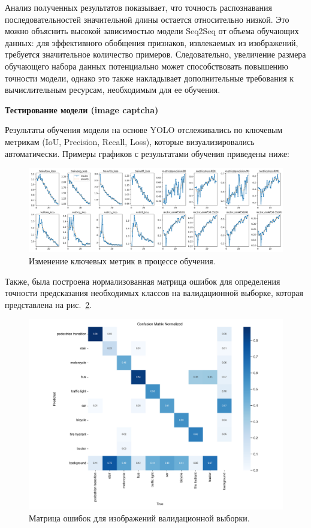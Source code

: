 Анализ полученных результатов показывает, что точность распознавания 
последовательностей значительной длины остается относительно низкой. Это можно 
объяснить высокой зависимостью модели Seq2Seq от объема обучающих данных: для 
эффективного обобщения признаков, извлекаемых из изображений, требуется 
значительное количество примеров. Следовательно, увеличение размера обучающего 
набора данных потенциально может способствовать повышению точности модели, 
однако это также накладывает дополнительные требования к вычислительным ресурсам, 
необходимым для ее обучения.

\textbf{Тестирование модели (image captcha)}

Результаты обучения модели на основе YOLO отслеживались по ключевым метрикам 
(IoU, Precision, Recall, Loss), которые визуализировались автоматически. Примеры 
графиков с результатами обучения приведены ниже:

\begin{figure}[H]
    \centering
    \includegraphics[width=1\linewidth]{imgs/imagecaptcha/results.png}
    \caption{Изменение ключевых метрик в процессе обучения.}
    \label{fig:metrics}
\end{figure}
\vspace{-0.5cm}

Также, была построена нормализованная матрица ошибок для определения точности 
предсказания необходимых классов на валидационной выборке, которая представлена 
на рис.~\ref{fig:confusion}.

\begin{figure}[H]
    \centering
    \includegraphics[width=1\linewidth]{
        imgs/imagecaptcha/confusion_matrix_normalized.png
    }
    \caption{Матрица ошибок для изображений валидационной выборки.}
    \label{fig:confusion}
\end{figure}
\vspace{-0.5cm}

